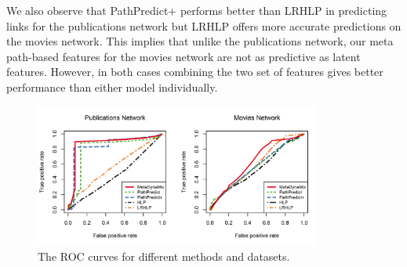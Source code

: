 We also observe that PathPredict+ performs better than LRHLP in predicting links for the publications network but LRHLP offers more accurate predictions on the movies network. This implies that unlike the publications network, our meta path-based features for the movies network are not as predictive as latent features. However, in both cases combining the two set of features gives better performance than either model individually.






\begin{figure}[t]
\centering
\includegraphics[trim = 0mm 35mm 0mm 35mm,width=0.84\textwidth]{figs/ROC.png}
\caption{The ROC curves for different methods and datasets.} \label{fig:auc}
\end{figure}


